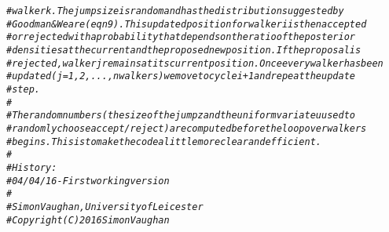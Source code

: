 \documentclass{article}\usepackage[]{graphicx}\usepackage[]{color}
\makeatletter
\newcommand{\hlcom}[1]{\textcolor[rgb]{0.678,0.584,0.686}{\textit{#1}}}%
\newenvironment{kframe}{%
 \def\at@end@of@kframe{}%
 \ifinner\ifhmode%
  \def\at@end@of@kframe{\end{minipage}}%
  \begin{minipage}{\columnwidth}%
 \fi\fi%
 \def\FrameCommand##1{\hskip\@totalleftmargin \hskip-\fboxsep
 \colorbox{shadecolor}{##1}\hskip-\fboxsep
     \hskip-\linewidth \hskip-\@totalleftmargin \hskip\columnwidth}%
 \MakeFramed {\advance\hsize-\width
   \@totalleftmargin\z@ \linewidth\hsize
   \@setminipage}}%
 {\par\unskip\endMakeFramed%
 \at@end@of@kframe}
\newenvironment{knitrout}{}{} %
\makeatother
\begin{document}
\begin{knitrout}
\begin{kframe}
\begin{alltt}
\hlcom{# walker k. The jump size is random and has the distribution suggested by }
\hlcom{# Goodman & Weare (eqn 9). This updated position for walker i is then accepted }
\hlcom{# or rejected with a probability that depends on the ratio of the posterior }
\hlcom{# densities at the current and the proposed new position. If the proposal is }
\hlcom{# rejected, walker j remains at its current position. Once every walker has been}
\hlcom{# updated (j = 1, 2, ..., nwalkers) we move to cycle i+1 and repeat the update }
\hlcom{# step.}
\hlcom{# }
\hlcom{# The random numbers (the size of the jump z and the uniform variate u used to }
\hlcom{# randomly choose accept/reject) are computed before the loop over walkers }
\hlcom{# begins. This is to make the code a little more clear and efficient.}
\hlcom{# }
\hlcom{# History:}
\hlcom{#  04/04/16 - First working version}
\hlcom{#}
\hlcom{# Simon Vaughan, University of Leicester}
\hlcom{# Copyright (C) 2016 Simon Vaughan}
\end{alltt}
\end{kframe}
\end{knitrout}
\end{document}
